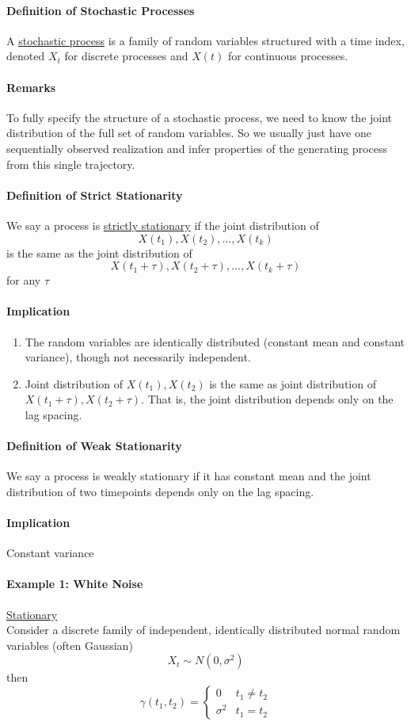 \documentclass[11pt]{article}
\newcommand{\under}[1]{\underline{#1}}
\begin{document}
\paragraph{Definition of Stochastic Processes}
A \under{stochastic process} is a family of random variables structured with a time index, denoted $X_t$ for discrete processes and $X(t)$ for continuous processes.
\paragraph{Remarks}
To fully specify the structure of a stochastic process, we need to know the joint distribution of the full set of random variables. So we usually just have one sequentially observed realization and infer properties of the generating process from this single trajectory.
\paragraph{Definition of Strict Stationarity}
We say a process is \under{strictly stationary} if the joint distribution of 
$$X(t_1), X(t_2), \hdots, X(t_k)$$
is the same as the joint distribution of 
$$X(t_1 + \tau), X(t_2 + \tau), \hdots, X(t_k + \tau)$$
for any $\tau$
\paragraph{Implication}
\begin{enumerate}
	\item The random variables are identically distributed (constant mean and constant variance), though not necessarily independent.
	\item Joint distribution of $X(t_1), X(t_2)$ is the same as joint distribution of $X(t_1 + \tau), X(t_2 + \tau)$. That is, the joint distribution depends only on the lag spacing.
\end{enumerate}

\paragraph{Definition of Weak Stationarity}
We say a process is weakly stationary if it has constant mean and the joint distribution of two timepoints depends only on the lag spacing.
\paragraph{Implication}
Constant variance

\paragraph{Example 1: White Noise}
\under{Stationary}\\
Consider a discrete family of independent, identically distributed normal random variables (often Gaussian)
$$X_t \sim N(0, \sigma^2)$$
then
$$\gamma(t_1, t_2) = \begin{cases}
	0 & t_1 \neq t_2 \\
	\sigma^2 & t_1 = t_2 
\end{cases}$$
\end{document}
